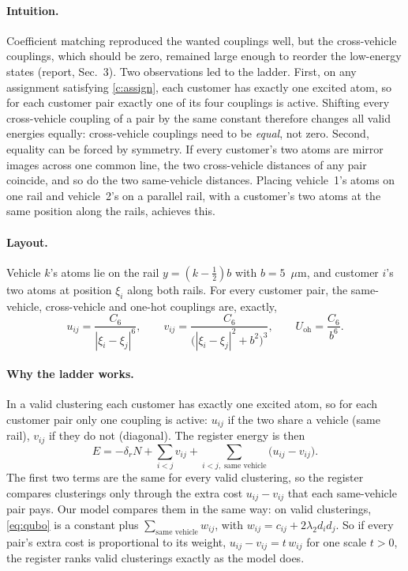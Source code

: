 \documentclass[10pt]{article}
\begin{document}
\paragraph{Intuition.} Coefficient matching reproduced the wanted couplings well, but the cross-vehicle couplings,
which should be zero, remained large enough to reorder the low-energy states (report, Sec.~3). Two
observations led to the ladder. First, on any assignment satisfying \eqref{c:assign}, each customer has exactly one
excited atom, so for each customer pair exactly one of its four couplings is active. Shifting every cross-vehicle
coupling of a pair by the same constant therefore changes all valid energies equally: cross-vehicle couplings need to
be \emph{equal}, not zero. Second, equality can be forced by symmetry. If every customer's two atoms are mirror images
across one common line, the two cross-vehicle distances of any pair coincide, and so do the two same-vehicle
distances. Placing vehicle~1's atoms on one rail and vehicle~2's on a parallel rail, with a customer's two atoms at the
same position along the rails, achieves this.

\paragraph{Layout.} Vehicle $k$'s atoms lie on the rail $y=(k-\tfrac12)b$ with $b=5$~$\mu$m, and customer $i$'s two
atoms at position $\xi_i$ along both rails. For every customer pair, the same-vehicle, cross-vehicle and one-hot
couplings are, exactly,
\[
  u_{ij}=\frac{C_6}{|\xi_i-\xi_j|^6},\qquad v_{ij}=\frac{C_6}{\big(|\xi_i-\xi_j|^2+b^2\big)^3},\qquad
  U_{\mathrm{oh}}=\frac{C_6}{b^6}.
\]
\paragraph{Why the ladder works.} In a valid clustering each customer has exactly one excited atom, so for each
customer pair only one coupling is active: $u_{ij}$ if the two share a vehicle (same rail), $v_{ij}$ if they do not
(diagonal). The register energy is then
\[
  E=-\delta_rN+\sum_{i<j}v_{ij}+\sum_{i<j,\;\text{same vehicle}}\big(u_{ij}-v_{ij}\big).
\]
The first two terms are the same for every valid clustering, so the register compares clusterings only through the
extra cost $u_{ij}-v_{ij}$ that each same-vehicle pair pays. Our model compares them in the same way: on valid
clusterings, \eqref{eq:qubo} is a constant plus $\sum_{\text{same vehicle}}w_{ij}$, with $w_{ij}=c_{ij}+2\lambda_2d_id_j$. So if
every pair's extra cost is proportional to its weight, $u_{ij}-v_{ij}=t\,w_{ij}$ for one scale $t>0$, the register ranks
valid clusterings exactly as the model does.
\end{document}
